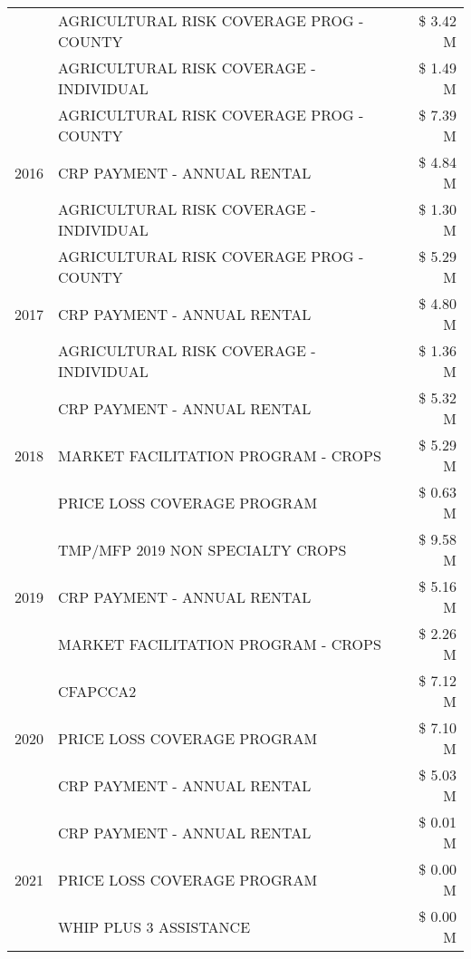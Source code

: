 \begin{tabular}{llr}
 & AGRICULTURAL RISK COVERAGE PROG - COUNTY & \$ 3.42 M \\
 & AGRICULTURAL RISK COVERAGE - INDIVIDUAL & \$ 1.49 M \\
\cline{1-3}
\multirow[t]{3}{*}{2016} & AGRICULTURAL RISK COVERAGE PROG - COUNTY & \$ 7.39 M \\
 & CRP PAYMENT - ANNUAL RENTAL & \$ 4.84 M \\
 & AGRICULTURAL RISK COVERAGE - INDIVIDUAL & \$ 1.30 M \\
\cline{1-3}
\multirow[t]{3}{*}{2017} & AGRICULTURAL RISK COVERAGE PROG - COUNTY & \$ 5.29 M \\
 & CRP PAYMENT - ANNUAL RENTAL & \$ 4.80 M \\
 & AGRICULTURAL RISK COVERAGE - INDIVIDUAL & \$ 1.36 M \\
\cline{1-3}
\multirow[t]{3}{*}{2018} & CRP PAYMENT - ANNUAL RENTAL & \$ 5.32 M \\
 & MARKET FACILITATION PROGRAM - CROPS & \$ 5.29 M \\
 & PRICE LOSS COVERAGE PROGRAM & \$ 0.63 M \\
\cline{1-3}
\multirow[t]{3}{*}{2019} & TMP/MFP 2019 NON SPECIALTY CROPS & \$ 9.58 M \\
 & CRP PAYMENT - ANNUAL RENTAL & \$ 5.16 M \\
 & MARKET FACILITATION PROGRAM - CROPS & \$ 2.26 M \\
\cline{1-3}
\multirow[t]{3}{*}{2020} & CFAPCCA2 & \$ 7.12 M \\
 & PRICE LOSS COVERAGE PROGRAM & \$ 7.10 M \\
 & CRP PAYMENT - ANNUAL RENTAL & \$ 5.03 M \\
\cline{1-3}
\multirow[t]{3}{*}{2021} & CRP PAYMENT - ANNUAL RENTAL & \$ 0.01 M \\
 & PRICE LOSS COVERAGE PROGRAM & \$ 0.00 M \\
 & WHIP PLUS 3 ASSISTANCE & \$ 0.00 M \\
\cline{1-3}
\bottomrule
\end{tabular}
